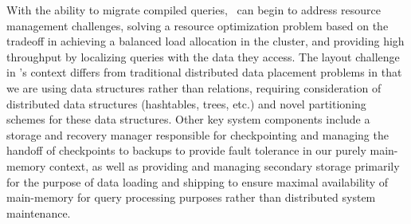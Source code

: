 {With the ability to migrate compiled queries, \compiler\ can begin to address
resource management challenges, solving a resource optimization problem based on
the tradeoff in achieving a balanced load allocation in the cluster, and
providing high throughput by localizing queries with the data they access. The
layout challenge in \compiler's context differs from traditional distributed data
placement problems in that we are using data structures rather than relations,
requiring consideration of distributed data structures (hashtables, trees, etc.)
and novel partitioning schemes for these data structures.
Other key system components include a storage and recovery manager responsible
for checkpointing and managing the handoff of checkpoints to backups to provide
fault tolerance in our purely main-memory context, as well as providing and
managing secondary storage primarily for the purpose of data loading and shipping
to ensure maximal availability of main-memory for query processing purposes
rather than distributed system maintenance.
}

